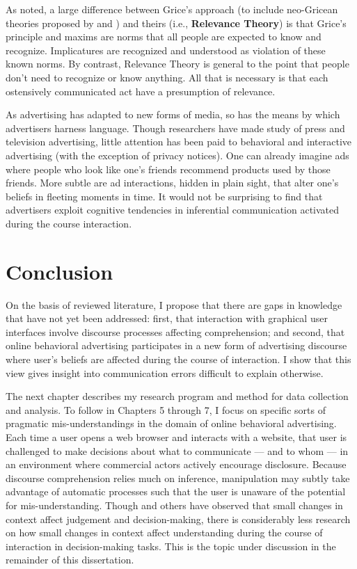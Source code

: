 As  \cite{Sperber:1986uk}  noted, a large difference between Grice's approach (to include neo-Gricean theories proposed by  \citealp{Horn:2006va} and \citealp{Levinson:2000ud})  and theirs  (i.e., \textbf{Relevance Theory})  is that Grice's principle and maxims are norms that all people are expected to know and recognize. Implicatures are recognized and understood as violation of these known norms. By contrast, Relevance Theory is general to the point that people don't need to recognize or know anything. All that is necessary is that each ostensively communicated act have a presumption of relevance.

As advertising has adapted to new forms of media, so has the means by which advertisers harness language. Though researchers have made study of press and television advertising, little attention has been paid to behavioral and interactive advertising (with the exception of privacy notices). One can already imagine ads where people who look like one's friends recommend products used by those friends. More subtle are ad interactions, hidden in plain sight, that alter one's beliefs in fleeting moments in time. It would not be surprising to find that advertisers exploit cognitive tendencies in inferential communication activated during the course interaction.

\section{Conclusion}
\label{conclusion}

On the basis of reviewed literature, I propose that there are gaps in knowledge that have not yet been addressed: first, that interaction with graphical user interfaces involve discourse processes affecting comprehension; and second, that online behavioral advertising participates in a new form of advertising discourse where user's beliefs are affected during the course of interaction. I show that this view gives insight into communication errors difficult to explain otherwise.

\begin{sloppier}
The next chapter describes my research program and method for data collection and analysis. To follow in Chapters 5 through 7, I focus on specific sorts of pragmatic mis-understandings in the domain of online behavioral advertising.  Each time a user opens a web browser and interacts with a website, that user is challenged to make decisions about what to communicate --- and to whom --- in an environment where commercial actors actively encourage disclosure. Because discourse comprehension relies much on inference, manipulation may subtly take advantage of automatic processes such that the user is unaware of the potential for mis-understanding. Though \cite{Kahneman:1984td} and others have observed that small changes in context affect judgement and decision-making, there is considerably less research on how small changes in context affect understanding during the course of interaction in decision-making tasks. This is the topic under discussion in the remainder of this dissertation.
\end{sloppier}


